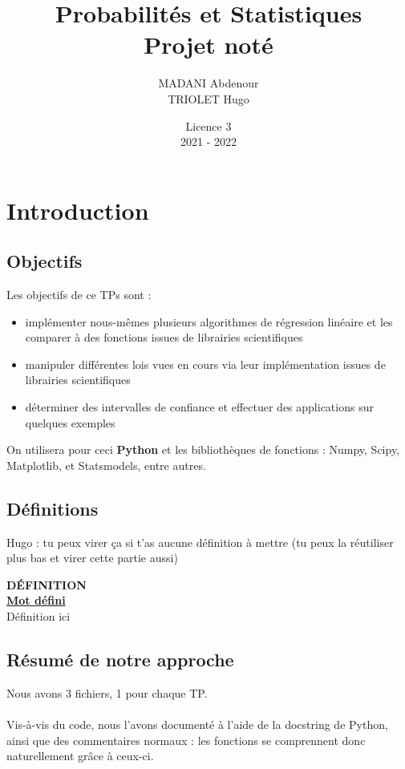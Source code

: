 \documentclass{article}      %
\title{Probabilités et Statistiques\\\Large{Projet noté}}
\author{MADANI Abdenour\\TRIOLET Hugo}
\date{Licence 3\\2021 - 2022}
\begin{document}
\normalsize
\maketitle

\renewcommand*\contentsname{Table des matières}
\tableofcontents
\newpage



\section{Introduction}
\subsection{Objectifs}
Les objectifs de ce TPs sont :
\begin{itemize}
  \item implémenter nous-mêmes plusieurs algorithmes de régression linéaire et les comparer à des fonctions issues de librairies scientifiques
  \item manipuler différentes lois vues en cours via leur implémentation issues de librairies scientifiques
  \item déterminer des intervalles de confiance et effectuer des applications sur quelques exemples
\end{itemize}

On utilisera pour ceci \textbf{Python} et les bibliothèques de fonctions : Numpy, Scipy, Matplotlib, et Statsmodels, entre autres.



\subsection{Définitions}

Hugo : tu peux virer ça si t'as aucune définition à mettre
(tu peux la réutiliser plus bas et virer cette partie aussi)
\begin{definition}
{ \scriptsize \textcolor{definition}{ \textbf{DÉFINITION}}}
\vspace{3px}
\\ \underline{\textbf{Mot défini}}
\vspace{2.5px}
\\ Définition ici
\end{definition}


\subsection{Résumé de notre approche}
Nous avons 3 fichiers, 1 pour chaque TP.
\\%
\\Vis-à-vis du code, nous l’avons documenté à l’aide de la docstring de Python, ainsi que des commentaires normaux : les fonctions se comprennent donc naturellement grâce à ceux-ci.
\end{document}
